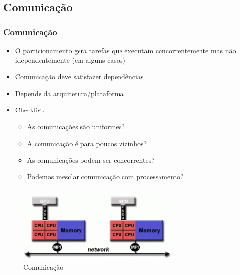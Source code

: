 \documentclass[xcolor={usenames,dvipsnames},12pt,presentation,aspectratio=169]{beamer}
\begin{document}
\subsection{Comunicação}
\begin{frame}
  \frametitle{Comunicação}
  \vspace{-2mm}
  \begin{itemize}
    \item O particionamento gera tarefas que executam concorrentemente mas não idependentemente (em alguns casos)
    \item Comunicação deve satisfazer dependências
    \item Depende da arquitetura/plataforma 
    \item Checklist:
      \begin{itemize}
        \item As comunicações são uniformes?
        \item A comunicação é para poucos vizinhos?
        \item As comunicações podem ser concorrentes?
        \item Podemos mesclar comunicação com processamento?
      \end{itemize}
  \end{itemize}
  \vspace{-5mm}
   \begin{columns}
     \begin{column}{0.6\textwidth}
        \begin{flushright}
          \begin{figure}
        \includegraphics[width=0.8\textwidth]{hybrid_model2.png}
            \caption{Comunicação}
          \end{figure}
        \end{flushright}
     \end{column}
     \begin{column}{0.4\textwidth}
        \begin{flushleft}

\end{flushleft}
\end{column}
\end{columns}
\end{frame}
\end{document}
